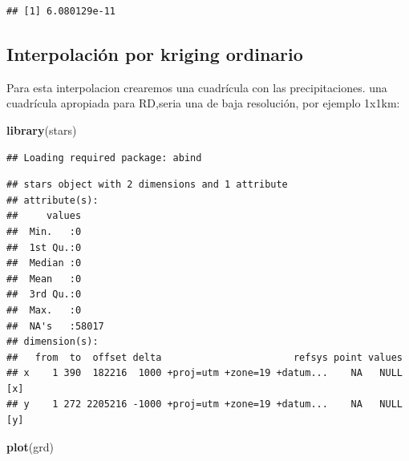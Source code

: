 \documentclass[11pt,]{article}
\newenvironment{Shaded}{\begin{snugshade}}{\end{snugshade}}
\newcommand{\KeywordTok}[1]{\textcolor[rgb]{0.13,0.29,0.53}{\textbf{#1}}}
\newcommand{\DataTypeTok}[1]{\textcolor[rgb]{0.13,0.29,0.53}{#1}}
\newcommand{\DecValTok}[1]{\textcolor[rgb]{0.00,0.00,0.81}{#1}}
\newcommand{\StringTok}[1]{\textcolor[rgb]{0.31,0.60,0.02}{#1}}
\newcommand{\OperatorTok}[1]{\textcolor[rgb]{0.81,0.36,0.00}{\textbf{#1}}}
\newcommand{\NormalTok}[1]{#1}
\begin{document}
\begin{verbatim}
## [1] 6.080129e-11
\end{verbatim}

\subsection{Interpolación por kriging
ordinario}\label{interpolaciuxf3n-por-kriging-ordinario}

Para esta interpolacion crearemos una cuadrícula con las
precipitaciones. una cuadrícula apropiada para RD,seria una de baja
resolución, por ejemplo 1x1km:

\begin{Shaded}
\begin{Highlighting}[]
\KeywordTok{library}\NormalTok{(stars)}
\end{Highlighting}
\end{Shaded}

\begin{verbatim}
## Loading required package: abind
\end{verbatim}

\begin{Shaded}
\end{Shaded}

\begin{verbatim}
## stars object with 2 dimensions and 1 attribute
## attribute(s):
##     values      
##  Min.   :0      
##  1st Qu.:0      
##  Median :0      
##  Mean   :0      
##  3rd Qu.:0      
##  Max.   :0      
##  NA's   :58017  
## dimension(s):
##   from  to  offset delta                       refsys point values    
## x    1 390  182216  1000 +proj=utm +zone=19 +datum...    NA   NULL [x]
## y    1 272 2205216 -1000 +proj=utm +zone=19 +datum...    NA   NULL [y]
\end{verbatim}

\begin{Shaded}
\begin{Highlighting}[]
\KeywordTok{plot}\NormalTok{(grd)}
\end{Highlighting}
\end{Shaded}
\end{document}
